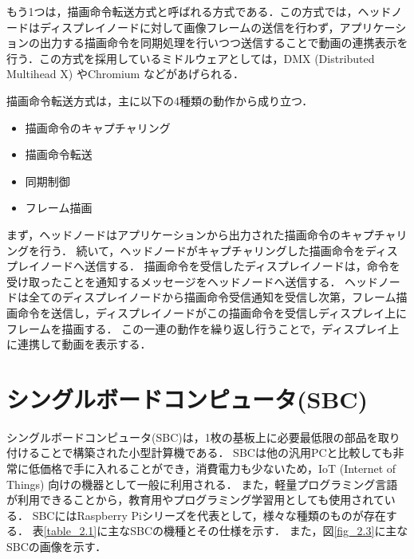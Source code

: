 もう1つは，描画命令転送方式と呼ばれる方式である．この方式では，ヘッドノードはディスプレイノードに対して画像フレームの送信を行わず，アプリケーションの出力する描画命令を同期処理を行いつつ送信することで動画の連携表示を行う．この方式を採用しているミドルウェアとしては，DMX (Distributed Multihead X) やChromium \cite{chromium}などがあげられる．

描画命令転送方式は，主に以下の4種類の動作から成り立つ．

\begin{itemize}
    \item 描画命令のキャプチャリング
    \item 描画命令転送
    \item 同期制御
    \item フレーム描画
\end{itemize}

  まず，ヘッドノードはアプリケーションから出力された描画命令のキャプチャリングを行う．
  続いて，ヘッドノードがキャプチャリングした描画命令をディスプレイノードへ送信する．
  描画命令を受信したディスプレイノードは，命令を受け取ったことを通知するメッセージをヘッドノードへ送信する．
  ヘッドノードは全てのディスプレイノードから描画命令受信通知を受信し次第，フレーム描画命令を送信し，ディスプレイノードがこの描画命令を受信しディスプレイ上にフレームを描画する．
  この一連の動作を繰り返し行うことで，ディスプレイ上に連携して動画を表示する．

\section*{シングルボードコンピュータ(SBC)}

シングルボードコンピュータ(SBC)は，1枚の基板上に必要最低限の部品を取り付けることで構築された小型計算機である．
SBCは他の汎用PCと比較しても非常に低価格で手に入れることができ，消費電力も少ないため，IoT (Internet of Things) 向けの機器として一般に利用される\cite{130007722836,7380571}．
また，軽量プログラミング言語が利用できることから，教育用やプログラミング学習用としても使用されている．
SBCにはRaspberry Piシリーズを代表として，様々な種類のものが存在する．
表\ref{table_2.1}に主なSBCの機種とその仕様を示す．
また，図\ref{fig_2.3}に主なSBCの画像を示す．

